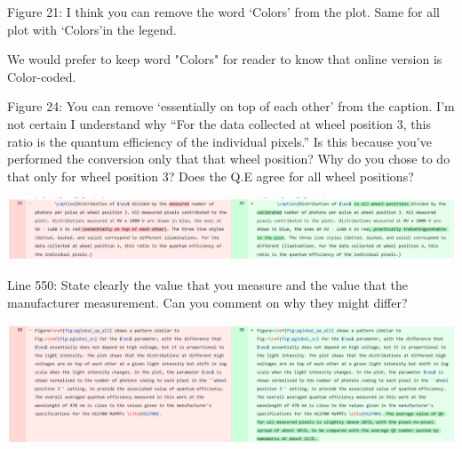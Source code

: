 \documentclass[11pt]{report}
\begin{document}
\begin{tcolorbox}[enlarge top by=2em,colbacktitle=blue!60!white,colframe=black!80!white,left=0pt,right=0pt,top=0pt,bottom=0pt,boxrule=0.3pt,title=\bfseries1.10]
Figure 21:  I think you can remove the word ‘Colors’ from the plot.  Same for all plot with ‘Colors’in the legend.
\end{tcolorbox}

We would prefer to keep word "Colors" for reader to know that online version is Color-coded.


\begin{tcolorbox}[enlarge top by=2em,colbacktitle=black!60!white,colframe=black!80!white,left=0pt,right=0pt,top=0pt,bottom=0pt,boxrule=0.3pt,title=\bfseries1.11]
Figure 24:  You can remove ‘essentially on top of each other’ from the caption.  I’m not certain I understand why “For the data collected at wheel position 3,  this ratio is the quantum efficiency of the individual pixels.” Is this because you’ve performed the conversion only that that wheel position? Why do you chose to do that only for wheel position 3?  Does the Q.E agree for all wheel positions?
\end{tcolorbox}


\includegraphics[width=\linewidth]{round1/1.11.png}

\begin{tcolorbox}[enlarge top by=2em,colbacktitle=black!60!white,colframe=black!80!white,left=0pt,right=0pt,top=0pt,bottom=0pt,boxrule=0.3pt,title=\bfseries1.12]
Line 550:  State clearly the value that you measure and the value that the manufacturer measurement.  Can you comment on why they might differ?
\end{tcolorbox}


\includegraphics[width=\linewidth]{round1/1.12.png}
\end{document}
